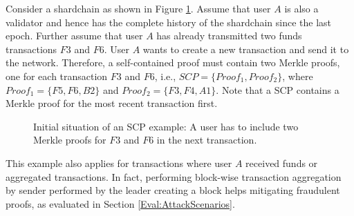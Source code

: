 \begin{example}
\label{ex:SCPExample}
Consider a shardchain as shown in Figure \ref{fig:SCPExample}. Assume that user $A$ is also a validator and hence has the complete history of the shardchain since the last epoch. Further assume that user $A$ has already transmitted two funds transactions $F3$ and $F6$. User $A$ wants to create a new transaction and send it to the network. Therefore, a self-contained proof must contain two Merkle proofs, one for each transaction $F3$ and $F6$, i.e., $SCP = \{Proof_1, Proof_2\}$, where $Proof_1 = \{F5, F6, B2\}$ and $Proof_2 = \{F3, F4, A1\}$. Note that a SCP contains a Merkle proof for the most recent transaction first.

\begin{figure}[hbt]
\centering
{}   
\caption{Initial situation of an SCP example: A user has to include two Merkle proofs for $F3$ and $F6$ in the next transaction.\label{fig:SCPExample}}
\end{figure}  
This example also applies for transactions where user $A$ received funds or aggregated transactions. In fact, performing block-wise transaction aggregation by sender performed by the leader creating a block helps mitigating fraudulent proofs, as evaluated in Section \ref{Eval:AttackScenarios}.
\end{example}

